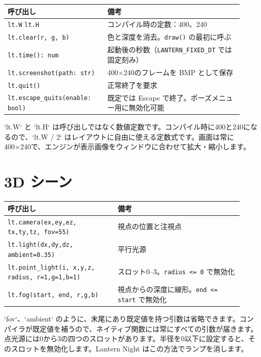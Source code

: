 \begin{center}
\small\begin{tabular}{@{}p{0.39\linewidth}p{0.53\linewidth}@{}}
\toprule
\textbf{呼び出し} & \textbf{備考} \\
\midrule
\texttt{lt.W} \enskip \texttt{lt.H} & コンパイル時の定数：400、240 \\
\texttt{lt.clear(r, g, b)} & 色と深度を消去。\texttt{draw()} の最初に呼ぶ \\
\texttt{lt.time(): num} & 起動後の秒数（\texttt{LANTERN\_FIXED\_DT} では固定刻み） \\
\texttt{lt.screenshot(path: str)} & 400$\times$240のフレームを BMP として保存 \\
\texttt{lt.quit()} & 正常終了を要求 \\
\texttt{lt.escape\_quits(enable: bool)} & 既定では Escape で終了。ポーズメニュー用に無効化可能 \\
\bottomrule
\end{tabular}
\end{center}

\noindent
`lt.W` と `lt.H` は呼び出しではなく数値定数です。コンパイル時に400と240になるので、`lt.W / 2` はレイアウトに自由に使える定数式です。画面は常に400×240で、エンジンが表示画像をウィンドウに合わせて拡大・縮小します。

\section{3D シーン}

\begin{center}
\small\begin{tabular}{@{}p{0.43\linewidth}p{0.49\linewidth}@{}}
\toprule
\textbf{呼び出し} & \textbf{備考} \\
\midrule
\texttt{lt.camera(ex,ey,ez, tx,ty,tz, fov=55)} & 視点の位置と注視点 \\
\texttt{lt.light(dx,dy,dz, ambient=0.35)} & 平行光源 \\
\texttt{lt.point\_light(i, x,y,z, radius, r=1,g=1,b=1)} & スロット0--3。\texttt{radius <= 0} で無効化 \\
\texttt{lt.fog(start, end, r,g,b)} & 視点からの深度に線形。\texttt{end <= start} で無効化 \\
\bottomrule
\end{tabular}
\end{center}

\noindent
`fov`、`ambient` のように、末尾にあり既定値を持つ引数は省略できます。コンパイラが既定値を補うので、ネイティブ関数には常にすべての引数が届きます。点光源には0から3の四つのスロットがあります。半径を0以下に設定すると、そのスロットを無効化します。Lantern Night はこの方法でランプを消します。

